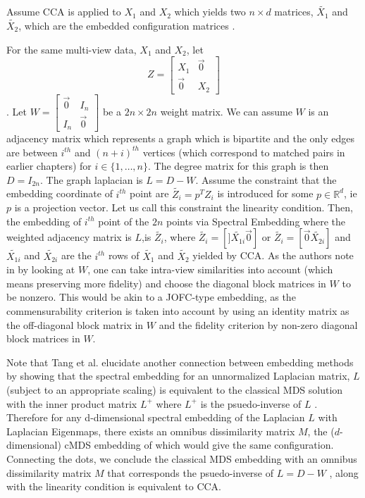 \documentclass[12pt,oneside,final]{thesis}\usepackage[]{graphicx}\usepackage[]{color}
\begin{document}
Assume CCA is applied to $X_1$ and $X_2$ which yields two  $n \times d$ matrices, $\tilde{X_1}$ and $\tilde{X_2}$,  which are the embedded configuration matrices . 

For the same multi-view data, $X_1$ and $X_2$,
let \[ Z= \left[
\begin{array}{cc}
                  X_1 & \vec{0} \\
                \vec{0}   & X_2 
                \end{array}
                \right]
                \].
                Let $W=\left[
                \begin{array}{cc}
                \vec{0} & I_n \\
                I_n   & \vec{0}
                \end{array}
                \right]$ be a $2n \times 2n$ weight matrix. We can assume $W$ is an adjacency matrix which represents a graph which is bipartite and the only  edges are between $i^{th}$ and $(n+i)^{th}$ vertices (which correspond to matched pairs in earlier chapters) for $i \in \{1,\ldots,n\}$. The degree matrix for this graph is then  $D=I_{2n}$. The graph laplacian is $L=D-W$. Assume the constraint that the embedding coordinate of $i^{th}$ point are $\widetilde{Z_i}=p^{T}Z_i$ is introduced for some $p \in \mathbb{R}^d$, ie $p$ is a projection vector. Let us call this constraint the linearity condition. Then, the embedding of $i^{th}$ point of the $2n$ points  via Spectral Embedding where the weighted adjacency matrix is $L$,is $\widetilde{Z_i}$, where $\widetilde{Z_i}= \left[] \tilde{X_{1i}} \vec{0} \right]$ or  $\tilde{Z_i}=\left[ \vec{0} \tilde{X_{2i}} \right]$ and $\tilde{X_{1i}}$ and $\tilde{X_{2i}}$ are  the $i^{th}$ rows of $\tilde{X_1}$ and $\tilde{X_2}$ yielded by CCA.  As the authors note in \cite{CCAviaSpectralEmbed} by looking at $W$, one can take intra-view similarities into account (which means preserving more fidelity) and choose the diagonal block matrices in $W$ to be nonzero.
                This would be akin to a JOFC-type embedding, as the commensurability criterion is taken into account by using  an identity matrix as the  off-diagonal block matrix in $W$ and the fidelity criterion by non-zero diagonal block matrices in $W$.
                
                Note that Tang et al.\cite{MinhTrosset_SpectralEmbed} elucidate another connection between embedding methods by showing that the spectral embedding for  an unnormalized Laplacian matrix, $L$ (subject to  an appropriate scaling) is equivalent to the classical MDS solution with the inner product matrix $L^{+}$ where $L^{+}$ is the psuedo-inverse of $L$ \cite{MinhTrosset_SpectralEmbed}. Therefore for any d-dimensional spectral embedding of the Laplacian $L$  with Laplacian Eigenmaps, there exists an omnibus dissimilarity matrix $M$, the ($d$-dimensional) cMDS embedding of which   would give the same configuration. Connecting the dots, we conclude the classical MDS embedding with an omnibus dissimilarity matrix $M$ that corresponds the psuedo-inverse of  $L=D-W$ , along with the linearity condition is equivalent to CCA.
\end{document}
